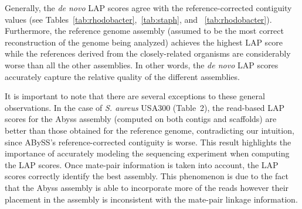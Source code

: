 \documentclass[12pt,\mydriver]{thesis}
\begin{document}
Generally, the \emph{de novo} LAP scores agree with the reference-corrected contiguity
values (see Tables~\ref{tab:rhodobacter},~\ref{tab:staph}, and ~\ref{tab:rhodobacter}).  Furthermore, the reference genome assembly (assumed to be the
most correct reconstruction of the genome being analyzed) achieves the
highest LAP score while the references derived from the closely-related
organisms are considerably worse than all the other assemblies.  In
other words, the \emph{de novo} LAP scores accurately capture the
relative quality of the different assemblies.

It is important to note that there are several exceptions to
these general observations. In the case of \emph{S. aureus} USA300 (Table~2),
the read-based LAP scores for the Abyss assembly (computed on both
contigs and scaffolds) are better than those obtained for the
reference genome, contradicting our intuition, since ABySS's reference-corrected contiguity is
worse. This result highlights the importance of accurately modeling
the sequencing experiment when computing the LAP scores.  Once
mate-pair information is taken into account, the LAP scores correctly
identify the best assembly.  This phenomenon is due to the fact that
the Abyss assembly is able to incorporate more of the reads however
their placement in the assembly is inconsistent with the mate-pair
linkage information.
\end{document}
